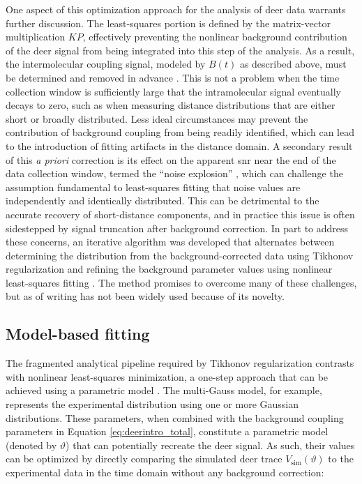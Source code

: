 One aspect of this optimization approach for the analysis of \gls{deer} data warrants further discussion. The least-squares portion is defined by the matrix-vector multiplication $KP$, effectively preventing the nonlinear background contribution of the \gls{deer} signal from being integrated into this step of the analysis. As a result, the intermolecular coupling signal, modeled by $B \left( t \right)$ as described above, must be determined and removed in advance \citep*{FabregasIbanez2020, Jeschke2004}. This is not a problem when the time collection window is sufficiently large that the intramolecular signal eventually decays to zero, such as when measuring distance distributions that are either short or broadly distributed. Less ideal circumstances may prevent the contribution of background coupling from being readily identified, which can lead to the introduction of fitting artifacts in the distance domain. A secondary result of this \emph{a priori} correction is its effect on the apparent \gls{snr} near the end of the data collection window, termed the “noise explosion” \citep*{FabregasIbanez2020}, which can challenge the assumption fundamental to least-squares fitting that noise values are independently and identically distributed. This can be detrimental to the accurate recovery of short-distance components, and in practice this issue is often sidestepped by signal truncation after background correction. In part to address these concerns, an iterative algorithm was developed that alternates between determining the distribution from the background-corrected data using Tikhonov regularization and refining the background parameter values using nonlinear least-squares fitting \citep*{FabregasIbanez2020a}. The method promises to overcome many of these challenges, but as of writing has not been widely used because of its novelty.

\subsection{Model-based fitting}

The fragmented analytical pipeline required by Tikhonov regularization contrasts with nonlinear least-squares minimization, a one-step approach that can be achieved using a parametric model \citep*{Burnham2002}. The multi-Gauss model, for example, represents the experimental distribution using one or more Gaussian distributions. These parameters, when combined with the background coupling parameters in Equation \ref{eq:deerintro_total}, constitute a parametric model (denoted by $\vartheta$) that can potentially recreate the \gls{deer} signal. As such, their values can be optimized by directly comparing the simulated \gls{deer} trace $V_\mathup{sim} \left( \vartheta \right)$ to the experimental data in the time domain without any background correction:

